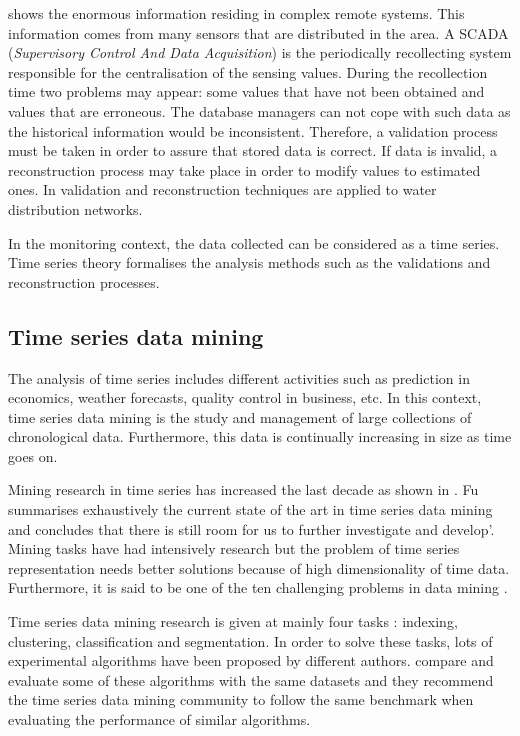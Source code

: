 \textcite{quevedo10} shows the enormous information residing in complex remote systems. This information comes from many sensors that are distributed in the area. A SCADA (\emph{Supervisory Control And Data Acquisition}) is the periodically recollecting system responsible for the centralisation of the sensing values. During the recollection time two problems may appear: some values that have not been obtained and values that are erroneous. The database managers can not cope with such data as the historical information would be inconsistent. Therefore, a validation process must be taken in order to assure that stored data is correct. If data is invalid, a reconstruction process may take place in order to modify values to estimated ones. In \cite{quevedo10} validation and reconstruction techniques are applied to water distribution networks. 

In the monitoring context, the data collected can be considered as a time
series.  Time series theory formalises the analysis methods such as the validations and reconstruction processes.








\subsection{Time series data mining}

The analysis of time series includes different activities such as prediction in economics, weather forecasts, quality control in business, etc. In this context, time series data mining is the study and management of large collections of chronological data. Furthermore, this data is continually increasing in size as time goes on.

Mining research in time series has increased the last decade as shown in \textcite{fu11}. Fu summarises exhaustively the current state of the art in time series data mining  and concludes that there is still room for us to further investigate and develop'. Mining tasks have had intensively research but the problem of  time series representation needs better solutions because of high dimensionality of time data. Furthermore, it is said to be one of the ten challenging problems in data mining \parencite{yangwu06}.
 
Time series data mining research  is given at mainly four tasks \parencite{keogh02}: indexing, clustering, classification and segmentation. In order to solve these tasks, lots of experimental algorithms have been proposed by different authors. \textcite{keogh02} compare and evaluate some of these algorithms with the same datasets and they recommend the time series data mining community to follow the same benchmark when evaluating the performance of similar algorithms. 


